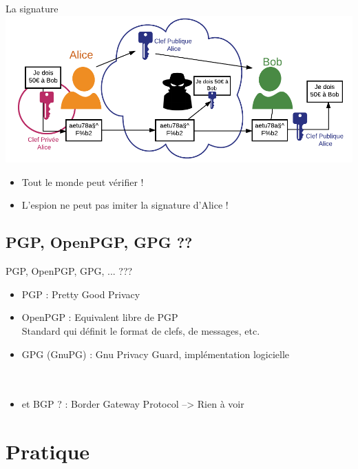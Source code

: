 \documentclass{beamer}
\begin{document}
\begin{frame}{La signature}
	\includegraphics[keepaspectratio, scale=0.36]{figures/signature2.png}
	\begin{itemize}
		\item Tout le monde peut vérifier !
		\item L'espion ne peut pas imiter la signature d'Alice !
	\end{itemize}
\end{frame}
\subsection{PGP, OpenPGP, GPG ??}
\begin{frame}{PGP, OpenPGP, GPG, ... ???}
	\begin{itemize}
	\item PGP : Pretty Good Privacy
	\item OpenPGP : Equivalent libre de PGP \\ Standard qui définit le format de clefs, de messages, etc.
	\item GPG (GnuPG) : Gnu Privacy Guard, implémentation logicielle\\ ~ \\ ~ \\
	\item et BGP ? : Border Gateway Protocol  --> Rien à voir
	\end{itemize}
\end{frame}



\section{Pratique}
\end{document}

